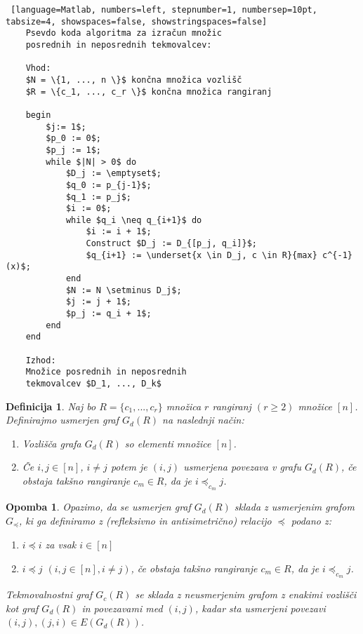 \documentclass[a4paper, 12pt]{book}
\newtheorem{definicija}{Definicija}[chapter]
\newtheorem{opomba}{Opomba}[chapter]
\begin{document}
\begin{minipage}{\linewidth}    
\begin{lstlisting} [language=Matlab, numbers=left, stepnumber=1, numbersep=10pt, tabsize=4, showspaces=false, showstringspaces=false]
    Psevdo koda algoritma za izračun množic 
    posrednih in neposrednih tekmovalcev:

    Vhod:
    $N = \{1, ..., n \}$ končna množica vozlišč
    $R = \{c_1, ..., c_r \}$ končna množica rangiranj
    
    begin
        $j:= 1$;
        $p_0 := 0$;
        $p_j := 1$;
        while $|N| > 0$ do
            $D_j := \emptyset$;
            $q_0 := p_{j-1}$;
            $q_1 := p_j$;
            $i := 0$;
            while $q_i \neq q_{i+1}$ do
                $i := i + 1$;
                Construct $D_j := D_{[p_j, q_i]}$;
                $q_{i+1} := \underset{x \in D_j, c \in R}{max} c^{-1}(x)$;
            end
            $N := N \setminus D_j$;
            $j := j + 1$;
            $p_j := q_i + 1$;
        end
    end
    
    Izhod: 
    Množice posrednih in neposrednih 
    tekmovalcev $D_1, ..., D_k$
\end{lstlisting}
\end{minipage}

\begin{definicija}
    Naj bo $R = \{ c_1, ..., c_r \}$ množica $r$ rangiranj $(r \geq 2)$ množice $[n]$. Definirajmo usmerjen graf $G_d(R)$  na naslednji način:
    \begin{enumerate}[label=(\roman*)]
        \item Vozlišča grafa $G_d(R)$ so elementi množice $[n]$.
        \item Če $i, j \in [n]$, $i \neq j$ potem je $(i, j)$ usmerjena povezava v grafu $G_d(R)$, če obstaja takšno rangiranje $c_m \in R$, da je $i \preceq_{c_m} j$.
    \end{enumerate}
\end{definicija}

\begin{opomba}
    Opazimo, da se usmerjen graf $G_d(R)$ sklada z usmerjenim grafom $G_{\preceq}$, ki ga definiramo z (refleksivno in antisimetrično) relacijo $\preceq$ podano z:
    \begin{enumerate}[label=(\roman*)]
        \item $i \preceq i$ za vsak $i \in [n]$
        \item $i \preceq j$ $(i,j \in [n], i \neq j)$, če obstaja takšno rangiranje $c_m \in R$, da je $i \preceq_{c_m} j$.
    \end{enumerate}
    Tekmovalnostni graf $G_c(R)$ se sklada z neusmerjenim grafom z enakimi vozlišči kot graf $G_d(R)$ in povezavami med $(i, j)$, kadar sta usmerjeni povezavi $(i, j), (j, i) \in E(G_d(R))$.
\end{opomba}
\end{document}
